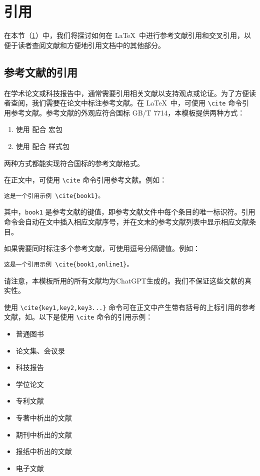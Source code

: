 \section{引用}\label{sec:reference}

在本节（\cref{sec:reference}）中，我们将探讨如何在 \LaTeX\ 中进行参考文献引用和交叉引用，以便于读者查阅文献和方便地引用文档中的其他部分。

\subsection{参考文献的引用}

在学术论文或科技报告中，通常需要引用相关文献以支持观点或论证。为了方便读者查阅，我们需要在论文中标注参考文献。在 \LaTeX\ 中，可使用 \verb|\cite| 命令引用参考文献。参考文献的外观应符合国标 GB/T 7714，本模板提供两种方式：
\begin{enumerate}
    \item 使用 \BibTeX{} 配合  宏包
    \item 使用 \BibLaTeX{} 配合  样式包
\end{enumerate}
两种方式都能实现符合国标的参考文献格式。

在正文中，可使用 \verb|\cite| 命令引用参考文献。例如：

\begin{Verbatim}
这是一个引用示例 \cite{book1}。
\end{Verbatim}

其中，\verb|book1| 是参考文献的键值，即参考文献文件中每个条目的唯一标识符。引用命令会自动在文中插入相应文献序号，并在文末的参考文献列表中显示相应文献条目。

如果需要同时标注多个参考文献，可使用逗号分隔键值。例如：

\begin{Verbatim}
这是一个引用示例 \cite{book1,online1}。
\end{Verbatim}

请注意，本模板所用的所有文献均为ChatGPT生成的。我们不保证这些文献的真实性。

使用 \verb|\cite{key1,key2,key3...}| 命令可在正文中产生带有括号的上标引用的参考文献，如\cite{book1,online1,article1}。以下是使用 \verb|\cite| 命令的引用示例：
\begin{itemize}
  \item 普通图书\cite{book1,book2}
  \item 论文集、会议录\cite{conf1,conf2}
  \item 科技报告\cite{techreport1,techreport2}
  \item 学位论文\cite{thesis1,thesis2,thesis3}
  \item 专利文献\cite{patent1,patent2}
  \item 专著中析出的文献\cite{inbook1,inbook2}
  \item 期刊中析出的文献\cite{qin2021,article1,article2}
  \item 报纸中析出的文献\cite{newspaper1,newspaper2}
  \item 电子文献\cite{online1,online2,online3}
\end{itemize}

